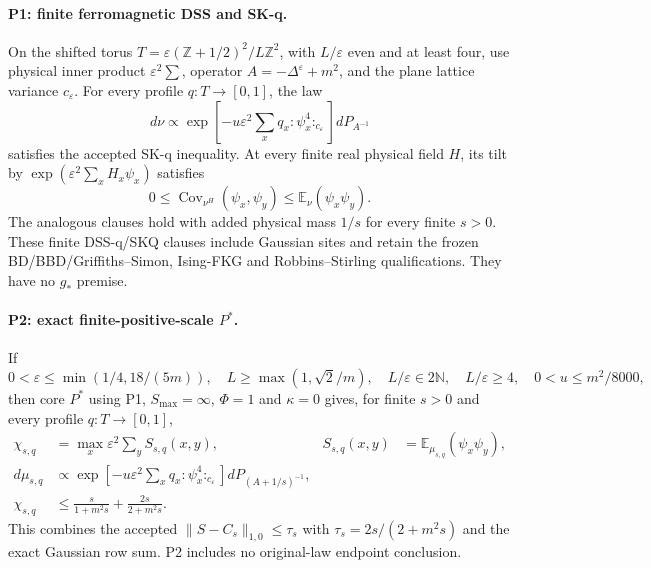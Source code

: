\documentclass[11pt]{article}
\theoremstyle{plain}
\theoremstyle{definition}
\theoremstyle{remark}
\newcommand{\N}{\mathbb{N}}
\newcommand{\Z}{\mathbb{Z}}
\newcommand{\E}{\mathbb{E}}
\begin{document}
\paragraph{P1: finite ferromagnetic DSS and SK-q.}
On the shifted torus
$T=\varepsilon(\Z+1/2)^2/L\Z^2$, with $L/\varepsilon$ even and at least
four, use physical inner product $\varepsilon^2\sum$, operator
$A=-\Delta^\varepsilon+m^2$, and the plane lattice variance
$c_\varepsilon$. For every profile $q:T\to[0,1]$, the law
\[
 d\nu\propto\exp\left[-u\varepsilon^2\sum_xq_x
                {:}\psi_x^4{:}_{c_\varepsilon}\right]dP_{A^{-1}}
\]
satisfies the accepted SK-q inequality. At every finite real physical
field $H$, its tilt by $\exp(\varepsilon^2\sum_xH_x\psi_x)$ satisfies
\[
 0\le\operatorname{Cov}_{\nu^H}(\psi_x,\psi_y)
       \le\E_\nu(\psi_x\psi_y).
\]
The analogous clauses hold with added physical mass $1/s$ for every finite
$s>0$. These finite DSS-q/SKQ clauses include Gaussian sites and retain the
frozen BD/BBD/Griffiths--Simon, Ising-FKG and Robbins--Stirling
qualifications. They have no $g_*$ premise.

\paragraph{P2: exact finite-positive-scale $P^*$.}
If
\[
 0<\varepsilon\le\min(1/4,18/(5m)),\quad
 L\ge\max(1,\sqrt2/m),\quad L/\varepsilon\in2\N,\quad
 L/\varepsilon\ge4,\quad0<u\le m^2/8000,
\]
then core $P^*$ using P1, $S_{\max}=\infty$, $\Phi=1$ and $\kappa=0$
gives, for finite $s>0$ and every profile $q:T\to[0,1]$,
\begin{align*}
 \chi_{s,q}&=\max_x\varepsilon^2\sum_y S_{s,q}(x,y),&
 S_{s,q}(x,y)&=\E_{\mu_{s,q}}(\psi_x\psi_y),\\
 d\mu_{s,q}&\propto\exp\left[-u\varepsilon^2\sum_xq_x
                 {:}\psi_x^4{:}_{c_\varepsilon}\right]dP_{(A+1/s)^{-1}},\\
 \chi_{s,q}&\le\frac{s}{1+m^2s}+\frac{2s}{2+m^2s}.
\end{align*}
This combines the accepted $\|S-C_s\|_{1,0}\le\tau_s$ with
$\tau_s=2s/(2+m^2s)$ and the exact Gaussian row sum. P2 includes no
original-law endpoint conclusion.

\end{document}
